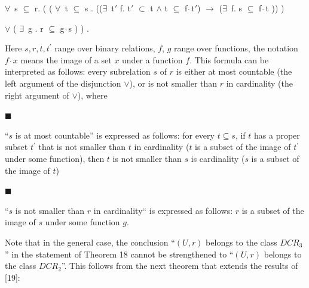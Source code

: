 $\forall\,$ s $\subseteq$ r. ( ( $\forall\,$ t $\subseteq$ s . (($\exists\,$ t\ensuremath{\prime} f. t\ensuremath{\prime} $\subset$ t $\wedge$ t $\subseteq$ f$\,\,\grave{\,}{}$t\ensuremath{\prime}) $\longrightarrow$ ($\exists\,$ f. s $\subseteq$ f$\,\,\grave{\,}{}$t )) )\par
 
 
 
$\vee$ ( $\exists\,$ g . r $\subseteq$ g$\,\,\grave{\,}{}$s ) ) .\par
 
 
 
Here $s,r,t,t^{\prime}$ range over binary relations, $f$, $g$ range over functions, the notation $f{\,\,\grave{\,}{}}x$ means the image of a set $x$ under a function $f$. This formula can be interpreted as follows: every subrelation $s$ of $r$ is either at most countable (the left argument of the disjunction $\vee$), or is not smaller than $r$ in cardinality (the right argument of $\vee$), where\par
  
\par\noindent  $\blacksquare$ 
 
“$s$ is at most countable” is expressed as follows: for every $t\subseteq s$, if $t$ has a proper subset $t^{\prime}$ that is not smaller than $t$ in cardinality ($t$ is a subset of the image of $t^{\prime}$ under some function), then $t$ is not smaller than $s$ is cardinality ($s$ is a subset of the image of $t$)\par
 
 
 
\par\noindent  $\blacksquare$ 
 
“$s$ is not smaller than $r$ in cardinality“ is expressed as follows: $r$ is a subset of the image of $s$ under some function $g$.\par
 
 
  
 
 
Note that in the general case, the conclusion “$(U,r)$ belongs to the class $DCR_{3}$” in the statement of Theorem 18 cannot be strengthened to “$(U,r)$ belongs to the class $DCR_{2}$”. This follows from the next theorem that extends the results of [19]:\par
 
